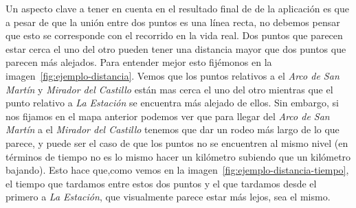 Un aspecto clave a tener en cuenta en el resultado final de de la aplicación es que a pesar de que la unión entre dos puntos es una línea recta, no debemos pensar que esto se corresponde con el recorrido en la vida real. Dos puntos que parecen estar cerca el uno del otro pueden tener una distancia mayor que dos puntos que parecen más alejados. Para entender mejor esto fijémonos en la imagen~\ref{fig:ejemplo-distancia}. Vemos que los puntos relativos a el \textit{Arco de San Martín} y \textit{Mirador del Castillo} están mas cerca el uno del otro mientras que el punto relativo a \textit{La Estación} se encuentra más alejado de ellos.
Sin embargo, si nos fijamos en el mapa anterior podemos ver que para llegar del \textit{Arco de San Martín} a el \textit{Mirador del Castillo} tenemos que dar un rodeo más largo de lo que parece, y puede ser el caso de que los puntos no se encuentren al mismo nivel (en términos de tiempo no es lo mismo hacer un kilómetro subiendo que un kilómetro bajando). Esto hace que,como vemos en la imagen~\ref{fig:ejemplo-distancia-tiempo}, el tiempo que tardamos entre estos dos puntos y el que tardamos desde el primero a \textit{La Estación}, que visualmente parece estar más lejos, sea el mismo.

